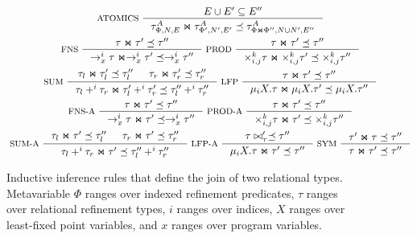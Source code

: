 \begin{figure}
  \centering
  \begin{gather*}
    \inference[ ATOMICS ]{
      E \union E' \subseteq E'' }{
      \tau^A_{\Phi, N, E} \Join \tau^A_{\Phi', N', E'} \subtype %
      \tau^A_{\Phi \Join \Phi'', N \union N', E''} } \\
    \inference[ FNS ]{
      \tau \Join \tau' \subtype \tau'' }{
      \to_x^i \tau \Join \to_x^i \tau' \subtype \to_x^i \tau'' }
    \inference[ PROD ]{
      \tau \Join \tau' \subtype \tau'' }{
      \times_{i, j}^k \tau \Join %
      \times_{i, j}^k \tau' \subtype \times_{i, j}^k \tau'' } \\
    \inference[ SUM ]{
      \tau_l \Join \tau_l' \subtype \tau_l'' &
      \tau_r \Join \tau_r' \subtype \tau_r'' }{
      \tau_l +^i \tau_r \Join \tau_l' +^i \tau_r' %
      \subtype \tau_l'' +^i \tau_r'' } 
    \inference[ LFP ]{
      \tau \Join \tau' \subtype \tau'' }{
      \mu_i X. \tau \Join \mu_i X. \tau' \subtype %
      \mu_i X. \tau'' } \\
    \inference[ FNS-A ]{
      \tau \Join \tau' \subtype \tau'' }{
      \to_x^i \tau \Join \tau' \subtype \to_x^i \tau'' }
    \inference[ PROD-A ]{
      \tau \Join \tau' \subtype \tau'' }{
      \times_{i, j}^k \tau \Join \tau' \subtype %
      \times_{i, j}^k \tau'' } \\
    \inference[ SUM-A ]{
      \tau_l \Join \tau' \subtype \tau_l'' &
      \tau_r \Join \tau' \subtype \tau_r'' }{
      \tau_l +^i \tau_r \Join \tau' %
      \subtype \tau_l'' +^i \tau_r'' } 
    \inference[ LFP-A ]{
      \tau \join \tau' \subtype \tau'' }{
      \mu_i X. \tau \Join \tau' \subtype \tau'' } 
    \inference[ SYM ]{ %
      \tau' \Join \tau \subtype \tau'' }{ %
      \tau \Join \tau' \subtype \tau'' } 
  \end{gather*}
  \caption{Inductive inference rules that define the join of two relational types.
    Metavariable $\Phi$ ranges over indexed refinement predicates, %
    $\tau$ ranges over relational refinement types, %
    $i$ ranges over indices, %
    $X$ ranges over least-fixed point variables, and %
    $x$ ranges over program variables. }
  \label{fig:join}
\end{figure}
